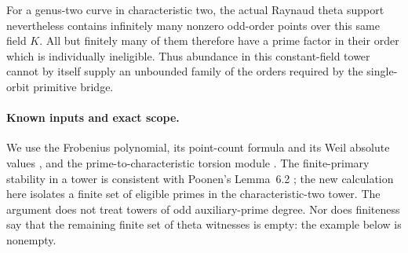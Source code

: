 \documentclass[11pt,a4paper]{article}
\begin{document}
For a genus-two curve in characteristic two, the actual Raynaud
theta support nevertheless contains infinitely many nonzero
odd-order points over this same field $K$. All but finitely many
of them therefore have a prime factor in their order which is
individually ineligible. Thus abundance in this constant-field
tower cannot by itself supply an unbounded family of the orders
required by the single-orbit primitive bridge.

\paragraph{Known inputs and exact scope.}
We use the Frobenius polynomial, its point-count formula and its
Weil absolute values \cite[Proposition~12.9 and Theorem~19.1]{MilneAV}, and the
prime-to-characteristic torsion module
\cite[Theorem~8.2 and Remark~8.4]{MilneAV}.
The finite-primary stability in a tower is consistent with
Poonen's Lemma~6.2 \cite{Poonen2005}; the new calculation here
isolates a finite set of eligible primes in the characteristic-two
tower. The argument does not treat towers of odd auxiliary-prime
degree. Nor does finiteness say that the remaining finite set of
theta witnesses is empty: the example below is nonempty.
\end{document}
